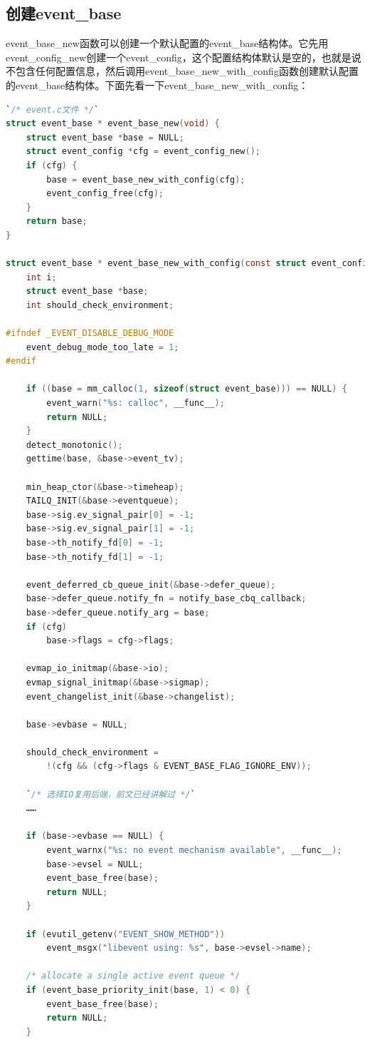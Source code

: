 \documentclass[11pt,a4paper]{article}
\begin{document}
\subsection{创建event\_base}
event\_base\_new函数可以创建一个默认配置的event\_base结构体。它先用event\_config\_new创建一个event\_config，这个配置结构体默认是空的，也就是说不包含任何配置信息，然后调用event\_base\_new\_with\_config函数创建默认配置的event\_base结构体。下面先看一下event\_base\_new\_with\_config：
\begin{lstlisting}[language=C]
`/* event.c文件 */`
struct event_base * event_base_new(void) {
	struct event_base *base = NULL;
	struct event_config *cfg = event_config_new();
	if (cfg) {
		base = event_base_new_with_config(cfg);
		event_config_free(cfg);
	}
	return base;
}

struct event_base * event_base_new_with_config(const struct event_config *cfg) {
	int i;
	struct event_base *base;
	int should_check_environment;

#ifndef _EVENT_DISABLE_DEBUG_MODE
	event_debug_mode_too_late = 1;
#endif

	if ((base = mm_calloc(1, sizeof(struct event_base))) == NULL) {
		event_warn("%s: calloc", __func__);
		return NULL;
	}
	detect_monotonic();
	gettime(base, &base->event_tv);

	min_heap_ctor(&base->timeheap);
	TAILQ_INIT(&base->eventqueue);
	base->sig.ev_signal_pair[0] = -1;
	base->sig.ev_signal_pair[1] = -1;
	base->th_notify_fd[0] = -1;
	base->th_notify_fd[1] = -1;

	event_deferred_cb_queue_init(&base->defer_queue);
	base->defer_queue.notify_fn = notify_base_cbq_callback;
	base->defer_queue.notify_arg = base;
	if (cfg)
		base->flags = cfg->flags;

	evmap_io_initmap(&base->io);
	evmap_signal_initmap(&base->sigmap);
	event_changelist_init(&base->changelist);

	base->evbase = NULL;

	should_check_environment =
	    !(cfg && (cfg->flags & EVENT_BASE_FLAG_IGNORE_ENV));

	`/* 选择IO复用后端，前文已经讲解过 */`
	……

	if (base->evbase == NULL) {
		event_warnx("%s: no event mechanism available", __func__);
		base->evsel = NULL;
		event_base_free(base);
		return NULL;
	}

	if (evutil_getenv("EVENT_SHOW_METHOD"))
		event_msgx("libevent using: %s", base->evsel->name);

	/* allocate a single active event queue */
	if (event_base_priority_init(base, 1) < 0) {
		event_base_free(base);
		return NULL;
	}


\end{lstlisting}
\end{document}
